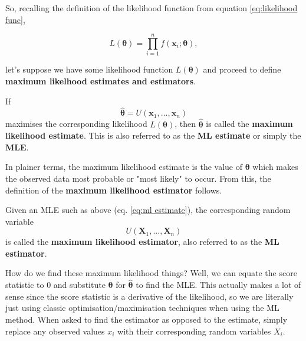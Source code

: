 \bigskip

So, recalling the definition of the likelihood function from equation \ref{eq:likelihood func}, 

\begin{equation*}
    L(\bm{\theta}) = \prod_{i=1}^n f(\bm{x}_i;\bm{\theta}),
\end{equation*}

let's suppose we have some likelihood function \(L(\bm{\theta})\) and proceed to define \textbf{maximum likelhood estimates and estimators}. 

\begin{definition}\label{defn:ml estimate}
    If 
    \begin{equation}\label{eq:ml estimate}
        \hat{\bm{\theta}} = U(\bm{x}_1,...,\bm{x}_n)
    \end{equation}
    maximises the corresponding likelihood \(L(\bm{\theta})\), then \(\hat{\bm{\theta}}\) is called the \textbf{maximum likelihood estimate}.
    This is also referred to as the \textbf{ML estimate} or simply the \textbf{MLE}.
\end{definition}

In plainer terms, the maximum likelihood estimate is the value of \(\bm{\theta}\) which makes the observed data most probable or "most likely" to occur. \autocite{rice}
From this, the definition of the \textbf{maximum likelihood estimator} follows.

\begin{definition}\label{defn:ml estimator}
    Given an MLE such as above (eq. \ref{eq:ml estimate}), the corresponding random variable
    \begin{equation}\label{eq:ml estimator}
        U(\bm{X}_1,...,\bm{X}_n)
    \end{equation}
    is called the \textbf{maximum likelihood estimator}, also referred to as the \textbf{ML estimator}.
\end{definition}

How do we find these maximum likelihood things? 
Well, we can equate the score statistic to \(0\) and substitute \(\bm{\theta}\) for \(\hat{\bm{\theta}}\) to find the MLE. 
This actually makes a lot of sense since the score statistic is a derivative of the likelihood, so we are literally just using classic optimisation/maximisation techniques when using the ML method. 
When asked to find the estimator as opposed to the estimate, simply replace any observed values \(x_i\) with their corresponding random variables \(X_i\).

